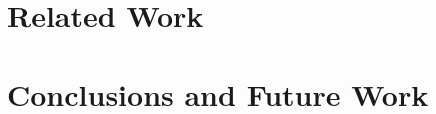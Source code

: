 \documentclass{entcs}
\begin{document}


\section{Related Work}
\label{sec:related-work}

\section{Conclusions and Future Work}
\label{sec:conclusion}
\end{document}
